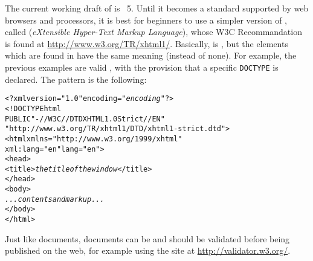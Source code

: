 The current working draft of \HTML is \HTML~5. Until it becomes a
standard supported by web browsers and \XSLT processors, it is best
for beginners to use a simpler version of \HTML, called \XHTML
(\emph{eXtensible Hyper-Text Markup Language}), whose W3C
Recommandation is found at
\url{http://www.w3.org/TR/xhtml1/}. Basically, \XHTML is \XML, but the
elements which are found in \HTML have the same meaning (instead of
none). For example, the previous examples are valid \XHTML, with the
provision that a specific \texttt{DOCTYPE} is declared. The pattern is
the following:
\begin{alltt}
<?xml version="1.0" encoding="\emph{encoding}"?>
<!DOCTYPE html
    PUBLIC "-//W3C//DTD XHTML 1.0 Strict//EN"
    "http://www.w3.org/TR/xhtml1/DTD/xhtml1-strict.dtd">
<html xmlns="http://www.w3.org/1999/xhtml"
      xml:lang="en" lang="en">
  <head>
    <title>\textit{the title of the window}</title>
  </head>
  <body>
     \emph{...contents and markup...}
  </body>
</html>
\end{alltt}
Just like \XML documents, \XHTML documents can be and should be
validated before being published on the web, for example using the
site at \url{http://validator.w3.org/}.

\mypar{\DTD}

